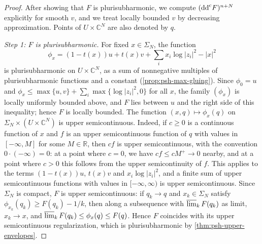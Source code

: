 \begin{proof}
After showing that $F$ is plurisubharmonic, we compute $(\mathrm{dd}^{\mathrm{c}} F)^{n+N}$ explicitly for smooth $v$, and we treat locally bounded $v$ by decreasing approximation. Points of $U\times\mathbb C^N$ are also denoted by $q$.

\emph{Step 1: $F$ is plurisubharmonic.} For fixed $x\in\Sigma_N$, the function
\[
 \phi_x=(1-t(x))u+t(x)v+\sum_ix_i\log|z_i|^2-|x|^2
\]
is plurisubharmonic on $U\times\mathbb C^N$, as a sum of nonnegative multiples of plurisubharmonic functions and a constant (\cref{prop:psh-max-gluing}). Since $\phi_0=u$ and $\phi_x\leq\max\{u,v\}+\sum_i\max\{\log|z_i|^2,0\}$ for all $x$, the family $(\phi_x)$ is locally uniformly bounded above, and $F$ lies between $u$ and the right side of this inequality; hence $F$ is locally bounded. The function $(x,q)\mapsto\phi_x(q)$ on $\Sigma_N\times(U\times\mathbb C^N)$ is upper semicontinuous. Indeed, if $c\geq0$ is a continuous function of $x$ and $f$ is an upper semicontinuous function of $q$ with values in $[-\infty,M]$ for some $M\in\mathbb R$, then $cf$ is upper semicontinuous, with the convention $0\cdot(-\infty)=0$: at a point where $c=0$, we have $cf\leq cM^+\to0$ nearby, and at a point where $c>0$ this follows from the upper semicontinuity of $f$. This applies to the terms $(1-t(x))u$, $t(x)v$ and $x_i\log|z_i|^2$, and a finite sum of upper semicontinuous functions with values in $[-\infty,\infty)$ is upper semicontinuous. Since $\Sigma_N$ is compact, $F$ is upper semicontinuous: if $q_k\to q$ and $x_k\in\Sigma_N$ satisfy $\phi_{x_k}(q_k)\geq F(q_k)-1/k$, then along a subsequence with $\varlimsup_kF(q_k)$ as limit, $x_k\to x$, and $\varlimsup_kF(q_k)\leq\phi_x(q)\leq F(q)$. Hence $F$ coincides with its upper semicontinuous regularization, which is plurisubharmonic by \cref{thm:psh-upper-envelopes}.


\end{proof}
